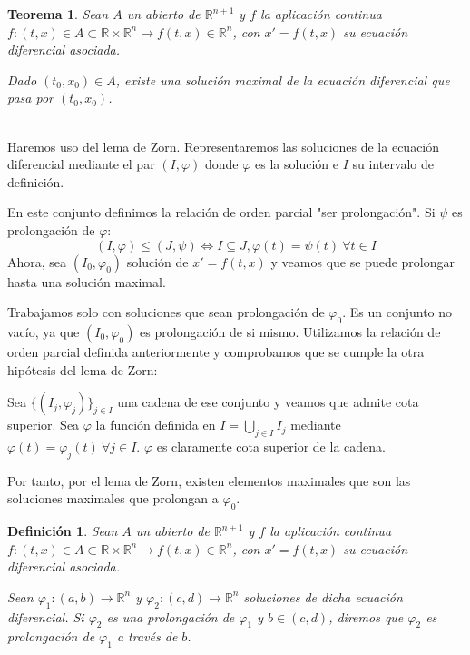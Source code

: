 \documentclass[11pt]{article}
\makeatletter
\newcommand{\iindex}[1]{\emph{#1}\index{#1}}
\theoremstyle{theorem-style}  %
\newtheorem{theorem}{Teorema}[section]  %
\renewenvironment{proof}[1][\proofname]{\par
	\pushQED{\qed}%
	\normalfont \topsep6\p@\@plus6\p@\relax
	\list{}{%
		\settowidth{\leftmargin}{\quad:\hskip\labelsep}%
		\setlength{\labelwidth}{0pt}%
		\setlength{\itemindent}{-\leftmargin}%
	}%
	\item[\hskip\labelsep\itshape#1\@addpunct{:}]\ignorespaces
}{%
	\popQED\endlist\@endpefalse
}
\theoremstyle{definition-style}
\newtheorem{definition}{Definición}[section]
\theoremstyle{example-style}
\makeatother
\begin{document}
\begin{theorem}
	Sean $ A $ un abierto de $ \mathbb{R}^{n+1} $ y $ f $ la aplicación continua $ f:(t,x)\in A\subset \mathbb{R}\times \mathbb{R}^n \longrightarrow f(t,x)\in \mathbb{R}^n $, con $  x'=f(t,x) $ su ecuación diferencial asociada. 
	
	Dado $ (t_0,x_0)\in A $, existe una solución maximal de la ecuación diferencial que pasa por $ (t_0,x_0) $.
	
\end{theorem}
\begin{proof} \ \\	
	Haremos uso del lema de Zorn. Representaremos las soluciones de la ecuación diferencial mediante el par $ (I,\varphi) $ donde $ \varphi $ es la solución e $ I $ su intervalo de definición.
	
	En este conjunto definimos la relación de orden parcial "ser prolongación". Si $ \psi $ es prolongación de $ \varphi $:
	\[ (I,\varphi)\leq (J,\psi)\Leftrightarrow I\subseteq J, \varphi(t)=\psi(t) \ \forall t \in I \]
	Ahora, sea $ (I_0,\varphi_0) $ solución de $ x'=f(t,x) $ y veamos que se puede prolongar hasta una solución maximal.
	
	Trabajamos solo con soluciones que sean prolongación de $ \varphi_0 $. Es un conjunto no vacío, ya que $ (I_0,\varphi_0) $ es prolongación de si mismo. Utilizamos la relación de orden parcial definida anteriormente y comprobamos que se cumple la otra hipótesis del lema de Zorn:
	
	Sea $ \{(I_j,\varphi_j) \}_{j\in I} $ una cadena de ese conjunto y veamos que admite cota superior. Sea $ \varphi $ la función definida en $ I=\bigcup_{j\in I}I_j $ mediante $ \varphi(t)=\varphi_j(t) \ \forall j \in I $. $ \varphi $ es claramente cota superior de la cadena.
	
	Por tanto, por el lema de Zorn, existen elementos maximales que son las soluciones maximales que prolongan a $ \varphi_0 $.	
\end{proof}
\begin{definition}
	Sean $ A $ un abierto de $ \mathbb{R}^{n+1} $ y $ f $ la aplicación continua $ f:(t,x)\in A\subset \mathbb{R}\times \mathbb{R}^n \longrightarrow f(t,x)\in \mathbb{R}^n $, con $  x'=f(t,x) $ su ecuación diferencial asociada. 
	
	Sean $ \varphi_1:(a,b)\longrightarrow \mathbb{R}^n $ y $ \varphi_2:(c,d)\longrightarrow \mathbb{R}^n $ soluciones de dicha ecuación diferencial. Si $ \varphi_2 $ es una prolongación de $ \varphi_1 $ y $ b\in(c,d) $, diremos que $ \varphi_2 $ es \iindex{prolongación de $ \varphi_1 $ a través de $ b $}.
\end{definition}
\end{document}
